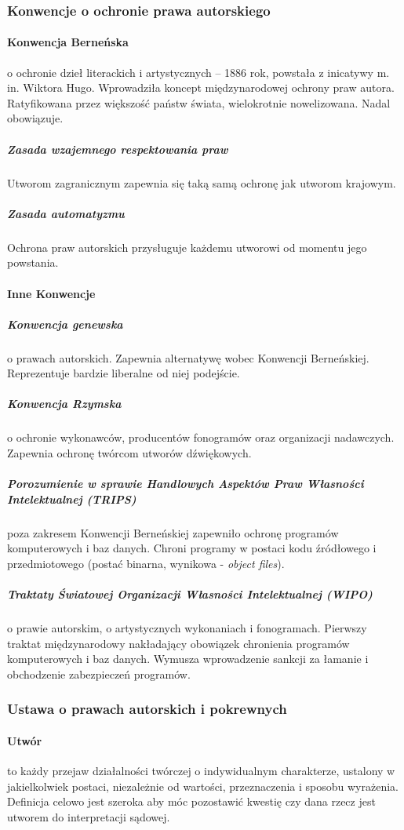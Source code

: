 \message{ !name(owi.tex)}\documentclass{article}
\begin{document}
\subsubsection{Konwencje o ochronie prawa autorskiego}
\paragraph{Konwencja Berneńska}
o ochronie dzieł literackich i artystycznych -- 1886 rok, powstała z inicatywy m. in. Wiktora Hugo.
Wprowadziła koncept międzynarodowej ochrony praw autora.
Ratyfikowana przez większość państw świata, wielokrotnie nowelizowana. Nadal obowiązuje.

\subparagraph{Zasada wzajemnego respektowania praw} Utworom zagranicznym zapewnia się taką samą ochronę jak utworom krajowym.

\subparagraph{Zasada automatyzmu}
Ochrona praw autorskich przysługuje każdemu utworowi od momentu jego powstania.

\paragraph{Inne Konwencje}

\subparagraph{Konwencja genewska} o prawach autorskich.
Zapewnia alternatywę wobec Konwencji Berneńskiej.
Reprezentuje bardzie liberalne od niej podejście.

\subparagraph{Konwencja Rzymska}
o ochronie wykonawców, producentów fonogramów oraz organizacji nadawczych.
Zapewnia ochronę twórcom utworów dźwiękowych.

\subparagraph{Porozumienie w sprawie Handlowych Aspektów Praw Własności Intelektualnej (TRIPS)}
poza zakresem Konwencji Berneńskiej zapewniło ochronę programów komputerowych i baz danych.
Chroni programy w postaci kodu źródłowego i przedmiotowego (postać binarna, wynikowa - \textit{object files}).

\subparagraph{Traktaty Światowej Organizacji Własności Intelektualnej (WIPO)}
o prawie autorskim, o artystycznych wykonaniach i fonogramach.
Pierwszy traktat międzynarodowy nakładający obowiązek chronienia programów komputerowych i baz danych.
Wymusza wprowadzenie sankcji za łamanie i obchodzenie zabezpieczeń programów.

\subsubsection{Ustawa o prawach autorskich i pokrewnych}

\paragraph{Utwór} to każdy przejaw działalności twórczej o indywidualnym charakterze, ustalony w jakielkolwiek postaci,
niezależnie od wartości, przeznaczenia i sposobu wyrażenia.
Definicja celowo jest szeroka aby móc pozostawić kwestię czy dana rzecz jest utworem do interpretacji sądowej.
\end{document}
